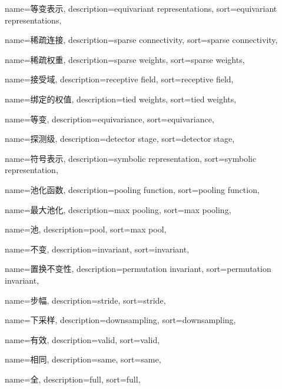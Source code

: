 {
  name=等变表示,
  description={equivariant representations},
  sort={equivariant representations},
}

{
  name=稀疏连接,
  description={sparse connectivity},
  sort={sparse connectivity},
}

{
  name=稀疏权重,
  description={sparse weights},
  sort={sparse weights},
}

{
  name=接受域,
  description={receptive field},
  sort={receptive field},
}

{
  name=绑定的权值,
  description={tied weights},
  sort={tied weights},
}

{
  name=等变,
  description={equivariance},
  sort={equivariance},
}

{
  name=探测级,
  description={detector stage},
  sort={detector stage},
}


{
	name=符号表示,
	description={symbolic representation},
	sort={symbolic representation},
}

{
  name=池化函数,
  description={pooling function},
  sort={pooling function},
}

{
  name=最大池化,
  description={max pooling},
  sort={max pooling},
}

{
  name=池,
  description={pool},
  sort={max pool},
}

{
  name=不变,
  description={invariant},
  sort={invariant},
}

{
  name=置换不变性,
  description={permutation invariant},
  sort={permutation invariant},
}

{
  name=步幅,
  description={stride},
  sort={stride},
}

{
  name=下采样,
  description={downsampling},
  sort={downsampling},
}

{
  name=有效,
  description={valid},
  sort={valid},
}

{
  name=相同,
  description={same},
  sort={same},
}

{
  name=全,
  description={full},
  sort={full},
}

